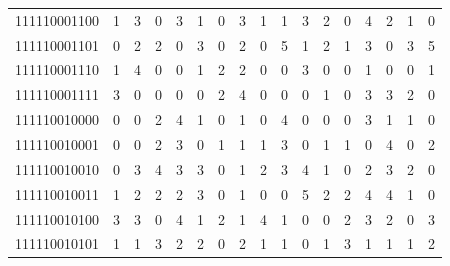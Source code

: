 \documentclass[10pt,a4paper]{article}
\begin{document}
\begin{longtable}{ |c|c|c|c|c|c|c|c|c|c|c|c|c|c|c|c|c| }
    111110001100              & 1                            & 3                                & 0                            & 3                              & 1   & 0   & 3   & 1   & 1   & 3   & 2   & 0   & 4   & 2   & 1   & 0   \\
    111110001101              & 0                            & 2                                & 2                            & 0                              & 3   & 0   & 2   & 0   & 5   & 1   & 2   & 1   & 3   & 0   & 3   & 5   \\
    111110001110              & 1                            & 4                                & 0                            & 0                              & 1   & 2   & 2   & 0   & 0   & 3   & 0   & 0   & 1   & 0   & 0   & 1   \\
    111110001111              & 3                            & 0                                & 0                            & 0                              & 0   & 2   & 4   & 0   & 0   & 0   & 1   & 0   & 3   & 3   & 2   & 0   \\
    111110010000              & 0                            & 0                                & 2                            & 4                              & 1   & 0   & 1   & 0   & 4   & 0   & 0   & 0   & 3   & 1   & 1   & 0   \\
    111110010001              & 0                            & 0                                & 2                            & 3                              & 0   & 1   & 1   & 1   & 3   & 0   & 1   & 1   & 0   & 4   & 0   & 2   \\
    111110010010              & 0                            & 3                                & 4                            & 3                              & 3   & 0   & 1   & 2   & 3   & 4   & 1   & 0   & 2   & 3   & 2   & 0   \\
    111110010011              & 1                            & 2                                & 2                            & 2                              & 3   & 0   & 1   & 0   & 0   & 5   & 2   & 2   & 4   & 4   & 1   & 0   \\
    111110010100              & 3                            & 3                                & 0                            & 4                              & 1   & 2   & 1   & 4   & 1   & 0   & 0   & 2   & 3   & 2   & 0   & 3   \\
    111110010101              & 1                            & 1                                & 3                            & 2                              & 2   & 0   & 2   & 1   & 1   & 0   & 1   & 3   & 1   & 1   & 1   & 2   \\

\end{longtable}
\end{document}
